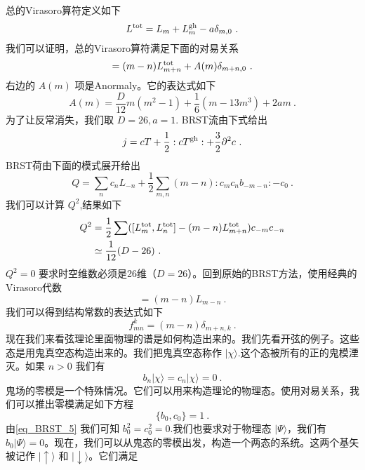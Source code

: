 总的Virasoro算符定义如下
\begin{equation}
L^{\rm tot} = L_m + L^{\rm gh}_m - a \delta_{m,0}~.
\end{equation}
我们可以证明，总的Virasoro算符满足下面的对易关系
\begin{equation}
[L^{\rm tot}_m,L^{\rm tot}_n] = (m-n) L^{\rm tot}_{m+n} + A(m) \delta_{m+n,0}~. 
\end{equation}
右边的 $A(m)$ 项是Anormaly。它的表达式如下
\begin{equation}
A(m) = \frac{D}{12} m (m^2-1) + \frac{1}{6} (m-13 m^3) + 2 a m~. 
\end{equation}
为了让反常消失，我们取 $D=26,a=1$. BRST流由下式给出
\begin{equation}
j = c T+ \frac{1}{2} : c T^{\rm gh} : + \frac{3}{2} \partial^2 c~.
\end{equation}
BRST荷由下面的模式展开给出
\begin{equation}
Q = \sum_n c_n L_{-n} + \frac{1}{2} \sum_{m,n} (m-n) :c_m c_n b_{-m-n}: -c_0~.
\end{equation}
我们可以计算 $Q^2$,结果如下
\begin{equation}
\begin{aligned}
Q^2&  = \frac{1}{2} \sum ( [L^{\rm tot}_m,L^{\rm tot}_n] - (m-n) L^{\rm tot}_{m+n} ) c_{-m} c_{-n} \\
& \simeq \frac{1}{12} (D-26)~.
\end{aligned}
\end{equation}
$Q^2=0$ 要求时空维数必须是26维（$D=26$）。回到原始的BRST方法，使用经典的Virasoro代数
\begin{equation}
[L_m,L_n]=(m-n)L_{m-n}~.
\end{equation}
我们可以得到结构常数的表达式如下
\begin{equation}
f^k_{mn} = (m-n) \delta_{m+n,k}~.
\end{equation}
现在我们来看弦理论里面物理的谱是如何构造出来的。我们先看开弦的例子。这些态是用鬼真空态构造出来的。我们把鬼真空态称作 $|\chi\rangle$.这个态被所有的正的鬼模湮灭。如果 $n>0$ 我们有
\begin{equation}
b_n|\chi\rangle = c_n|\chi\rangle = 0~.
\end{equation}
鬼场的零模是一个特殊情况。它们可以用来构造理论的物理态。使用对易关系，我们可以推出零模满足如下方程
\begin{equation}
\{b_0,c_0\} = 1~.
\end{equation}
由\autoref{eq_BRST_5} 我们可知 $b_0^2=c_0^2=0$.我们也要求对于物理态 $|\Psi\rangle$，我们有 $b_0|\Psi\rangle = 0$。现在，我们可以从鬼态的零模出发，构造一个两态的系统。这两个基矢被记作 $|\uparrow\rangle$ 和 $|\downarrow\rangle$。它们满足
